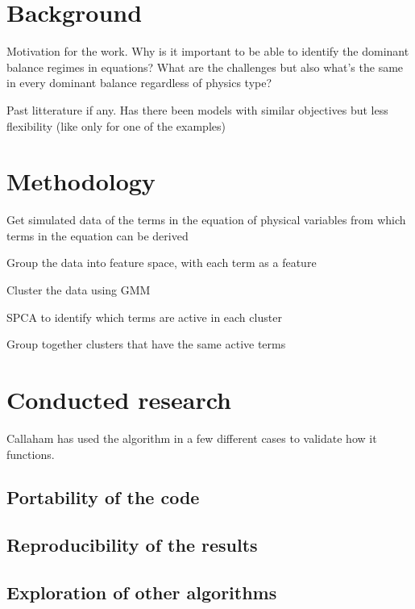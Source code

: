 \documentclass[12pt]{report} %
\begin{document}
\chapter{Background}


Motivation for the work. Why is it important to be able to identify the dominant balance regimes in equations? What are the challenges but also what's the same in every dominant balance regardless of physics type?



Past litterature if any. Has there been models with similar objectives but less flexibility (like only for one of the examples)





\chapter{Methodology}


Get simulated data of the terms in the equation of physical variables from which terms in the equation can be derived

Group the data into feature space, with each term as a feature

Cluster the data using GMM

SPCA to identify which terms are active in each cluster

Group together clusters that have the same active terms


\chapter{Conducted research}

Callaham has used the algorithm in a few different cases to validate how it functions.



\section{Portability of the code}

\section{Reproducibility of the results}

\section{Exploration of other algorithms}
\end{document}
